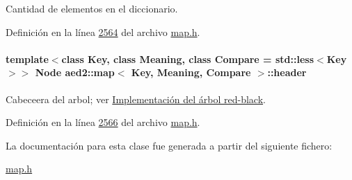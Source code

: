 Cantidad de elementos en el diccionario. 



Definición en la línea \hyperlink{map_8h_source_l02564}{2564} del archivo \hyperlink{map_8h_source}{map.\+h}.

\paragraph[{\texorpdfstring{header}{header}}]{\setlength{\rightskip}{0pt plus 5cm}template$<$class Key, class Meaning, class Compare = std\+::less$<$\+Key$>$$>$ {\bf Node} {\bf aed2\+::map}$<$ Key, Meaning, Compare $>$\+::header\hspace{0.3cm}{\ttfamily [private]}}\hypertarget{classaed2_1_1map_a92d93f905c8ad73fba18fdc7e8915cce_a92d93f905c8ad73fba18fdc7e8915cce}{}\label{classaed2_1_1map_a92d93f905c8ad73fba18fdc7e8915cce_a92d93f905c8ad73fba18fdc7e8915cce}


Cabeceera del arbol; ver \hyperlink{Implementacion}{Implementación del árbol red-\/black}. 



Definición en la línea \hyperlink{map_8h_source_l02566}{2566} del archivo \hyperlink{map_8h_source}{map.\+h}.



La documentación para esta clase fue generada a partir del siguiente fichero\+:\begin{DoxyCompactItemize}
\item 
\hyperlink{map_8h}{map.\+h}\end{DoxyCompactItemize}
